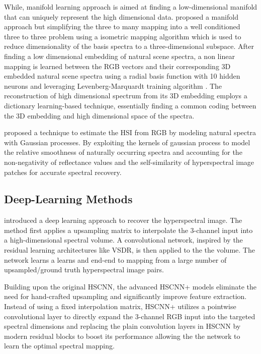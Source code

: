 \documentclass[stu]{apa7}
\begin{document}
While, manifold learning approach is aimed at finding a low-dimensional manifold that can uniquely represent the high dimensional data. \textcite{8237766} proposed a manifold approach but simplifying the three to many mapping into a well conditioned three to three problem using a isometric mapping algorithm which is used to reduce dimensionality of the basis spectra to a three-dimensional subspace. After finding a low dimensional embedding of natural scene spectra, a non linear mapping is learned between the RGB vectors and their corresponding 3D embedded natural scene spectra using a radial basis function with 10 hidden neurons and leveraging Levenberg-Marquardt training algorithm \parencite{Levenberg1944AMF,Marquardt1963AnAF}. The reconstruction of high dimensional spectrum from its 3D embedding employs a dictionary learning-based technique, essentially finding a common coding between the 3D embedding and high dimensional space of the spectra.

\textcite{akhtar2018hyperspectralrecoveryrgbimages} proposed a technique to estimate the HSI from RGB by modeling natural spectra with Gaussian processes. By exploiting the kernels of gaussian process to model the relative smoothness of naturally occurring spectra and accounting for the non-negativity of reflectance values and the self-similarity of hyperspectral image patches for accurate spectral recovery.

\subsection{Deep-Learning Methods}
\cite{Xiong2017HSCNNCH} introduced a deep learning approach to recover the hyperspectral image. The method first applies a upsampling matrix to interpolate the 3-channel input into a high-dimensional spectral volume. A convolutional network, inspired by the residual learning architectures like VSDR, is then applied to the the volume. The network learns a learns and end-end to mapping from a large number of upsampled/ground truth hyperspectral image pairs.

Building upon the original HSCNN, the advanced HSCNN+ \parencite{Shi2018HSCNNAC} models eliminate the need for hand-crafted upsampling and significantly improve feature extraction.
Instead of using a fixed interpolation matrix, HSCNN+ utilizes a pointwise convolutional layer to directly expand the 3-channel RGB input into the targeted spectral dimensions and replacing the plain convolution layers in HSCNN by modern residual blocks to boost its performance allowing the the network to learn the optimal spectral mapping.
\end{document}
